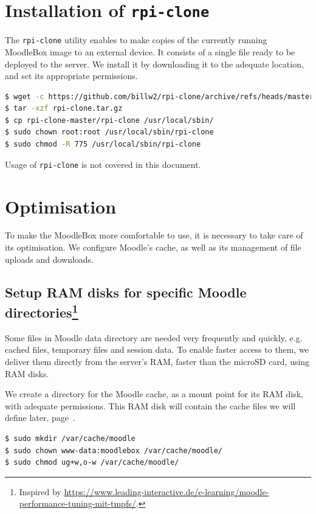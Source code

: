 \documentclass[12pt]{article}
\begin{document}
\section{Installation of \texttt{rpi-clone}}

The \texttt{rpi-clone} utility enables to make copies of the currently running MoodleBox image to an external device.
It consists of a single file ready to be deployed to the server.
We install it by downloading it to the adequate location, and set its appropriate permissions.
\begin{lstlisting}[language=bash]
$ wget -c https://github.com/billw2/rpi-clone/archive/refs/heads/master.tar.gz -O rpi-clone.tar.gz
$ tar -xzf rpi-clone.tar.gz
$ cp rpi-clone-master/rpi-clone /usr/local/sbin/
$ sudo chown root:root /usr/local/sbin/rpi-clone
$ sudo chmod -R 775 /usr/local/sbin/rpi-clone
\end{lstlisting}

Usage of \texttt{rpi-clone} is not covered in this document.

\section{Optimisation}\label{sec-optimisation}

To make the MoodleBox more comfortable to use, it is necessary to take care of its optimisation.
We configure Moodle's cache, as well as its management of file uploads and downloads.

\subsection[Setup RAM disks for specific Moodle directories]{Setup RAM disks for specific Moodle directories\footnote{Inspired by \url{https://www.leading-interactive.de/e-learning/moodle-performance-tuning-mit-tmpfs/}.}}

Some files in Moodle data directory are needed very frequently and quickly, e.g. cached files, temporary files and session data.
To enable faster access to them, we deliver them directly from the server's RAM, faster than the microSD card, using RAM disks.

We create a directory for the Moodle cache, as a mount point for its RAM disk, with adequate permissions.
This RAM disk will contain the cache files we will define later, page~\pageref{ssec-cache}. 
\begin{lstlisting}[language=bash]
$ sudo mkdir /var/cache/moodle
$ sudo chown www-data:moodlebox /var/cache/moodle/
$ sudo chmod ug+w,o-w /var/cache/moodle/
\end{lstlisting}
\end{document}
